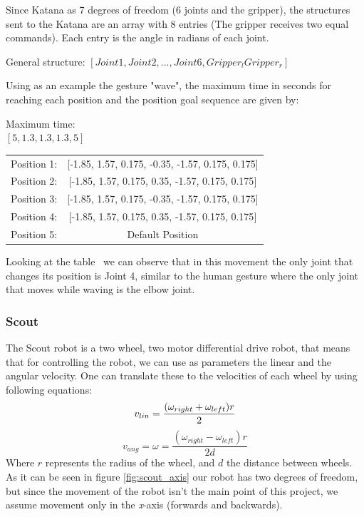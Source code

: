 Since Katana as 7 degrees of freedom (6 joints and the gripper), the structures sent to the Katana are an array with 8 entries (The gripper receives two equal commands). Each entry is the angle in radians of each joint.

\begin{center}
General structure:
$\left[ Joint1, Joint2, ... , Joint6, Gripper_l Gripper_r\right]$
\end{center}

Using as an example the gesture "wave", the maximum time in seconds for reaching each position and the position goal sequence are given by:

\begin{center}
Maximum time: \\
$\left[5, 1.3, 1.3, 1.3, 5\right]$
\end{center}

\begin{table}[!h]
\centering
\begin{tabular}{lc}
Position 1: & {[}-1.85, 1.57, 0.175, -0.35, -1.57, 0.175, 0.175{]} \\
Position 2: & {[}-1.85, 1.57, 0.175,  0.35, -1.57, 0.175, 0.175{]}  \\
Position 3: & {[}-1.85, 1.57, 0.175, -0.35, -1.57, 0.175, 0.175{]} \\
Position 4: & {[}-1.85, 1.57, 0.175,  0.35, -1.57, 0.175, 0.175{]}  \\
Position 5: & Default Position                                    
\end{tabular}
\end{table}

Looking at the table~ we can observe that in this movement the only joint that changes its position is Joint 4, similar to the human gesture where the only joint that moves while waving is the elbow joint.

\subsubsection{Scout}
The Scout robot is a two wheel, two motor differential drive robot, that means that for controlling the robot, we can use as parameters the linear and the angular velocity. One can translate these to the velocities of each wheel by using following equations:
\begin{equation}
v_{lin} = \frac{(\omega_{right}+\omega_{left})r}{2} \\
\end{equation}
\begin{equation}
v_{ang} = \omega = \frac{(\omega_{right}-\omega_{left})r}{2d}
\end{equation}
Where $r$ represents the radius of the wheel, and $d$ the distance between wheels.
As it can be seen in figure \ref{fig:scout_axis} our robot has two degrees of freedom, but since the movement of the robot isn't the main point of this project, we assume movement only in the \textit{x}-axis (forwards and backwards).


